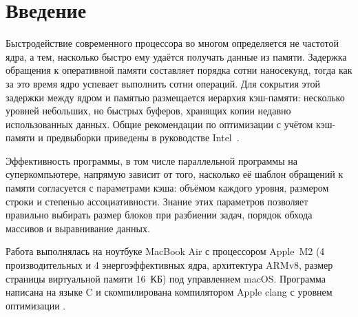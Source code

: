 \section*{Введение}

Быстродействие современного процессора во многом определяется не частотой ядра, а тем, насколько быстро ему удаётся получать данные из памяти. Задержка обращения к оперативной памяти составляет порядка сотни наносекунд, тогда как за это время ядро успевает выполнить сотни операций. Для сокрытия этой задержки между ядром и памятью размещается иерархия кэш-памяти: несколько уровней небольших, но быстрых буферов, хранящих копии недавно использованных данных. Общие рекомендации по оптимизации с учётом кэш-памяти и предвыборки приведены в руководстве Intel~\cite{intel-opt}.

Эффективность программы, в том числе параллельной программы на суперкомпьютере, напрямую зависит от того, насколько её шаблон обращений к памяти согласуется с параметрами кэша: объёмом каждого уровня, размером строки и степенью ассоциативности. Знание этих параметров позволяет правильно выбирать размер блоков при разбиении задач, порядок обхода массивов и выравнивание данных.

Работа выполнялась на ноутбуке MacBook Air с процессором Apple~M2 (4 производительных и 4 энергоэффективных ядра, архитектура ARMv8, размер страницы виртуальной памяти 16~КБ) под управлением macOS. Программа написана на языке C и скомпилирована компилятором Apple clang с уровнем оптимизации .
